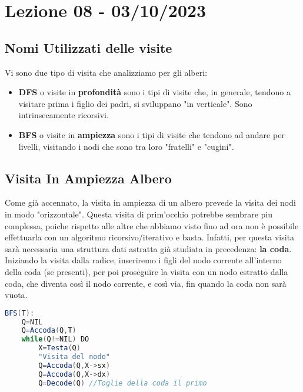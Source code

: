 \section{Lezione 08 - 03/10/2023}
\subsection{Nomi Utilizzati delle visite}
Vi sono due tipo di visita che analizziamo per gli alberi:
\begin{itemize}
	\item \textbf{DFS} o visite in \textbf{profondità} sono i tipi di visite che, in generale, tendono a visitare prima i figlio dei padri, si sviluppano "in verticale". Sono intrinsecamente ricorsivi.
	\item \textbf{BFS} o visite in \textbf{ampiezza} sono i tipi di visite che tendono ad andare per livelli, visitando i nodi che sono tra loro "fratelli" e "cugini".
\end{itemize}

\subsection{Visita In Ampiezza Albero}
Come già accennato, la visita in ampiezza di un albero prevede la visita dei nodi in modo "orizzontale". Questa visita di prim'occhio potrebbe sembrare piu complessa, poiche rispetto alle altre che abbiamo visto fino ad ora non è possibile effettuarla con un algoritmo ricorsivo/iterativo e basta. Infatti, per questa visita sarà necessaria una struttura dati astratta già studiata in precedenza: \textbf{la coda}.
Iniziando la visita dalla radice, inseriremo i figli del nodo corrente all'interno della coda (se presenti), per poi proseguire la visita con un nodo estratto dalla coda, che diventa così il nodo corrente, e così via, fin quando la coda non sarà vuota.

\begin{lstlisting}[language=Java]
	BFS(T):
	Q=NIL
	Q=Accoda(Q,T)
	while(Q!=NIL) DO
		X=Testa(Q)
		"Visita del nodo"
		Q=Accoda(Q,X->sx)
		Q=Accoda(Q,X->dx)
		Q=Decode(Q) //Toglie della coda il primo	
\end{lstlisting}

